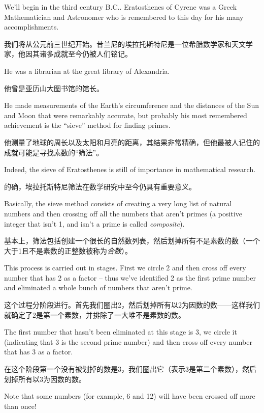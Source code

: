 We'll begin in the 
third century B.C..   
Eratosthenes of Cyrene was a Greek Mathematician and
Astronomer who is remembered to this day for his many accomplishments.

我们将从公元前三世纪开始。昔兰尼的埃拉托斯特尼是一位希腊数学家和天文学家，他因其诸多成就至今仍被人们铭记。

He was a librarian at the great library of Alexandria.

他曾是亚历山大图书馆的馆长。

He made
measurements of the Earth's circumference and the distances of
the Sun and Moon that were remarkably accurate, but probably his
most remembered achievement is the ``sieve'' method for finding
primes.

他测量了地球的周长以及太阳和月亮的距离，其结果非常精确，但他最被人记住的成就可能是寻找素数的“筛法”。

Indeed, the sieve of Eratosthenes 
is still of importance
in mathematical research.

的确，埃拉托斯特尼筛法在数学研究中至今仍具有重要意义。

Basically, the sieve method consists 
of creating a very long list of natural numbers and then crossing
off all the numbers that aren't primes (a positive integer that
isn't 1, and isn't a prime is called \emph{ composite}).

基本上，筛法包括创建一个很长的自然数列表，然后划掉所有不是素数的数（一个大于1且不是素数的正整数被称为\emph{合数}）。

This process
is carried out in stages.  First we circle 2 and then cross off
every number that has 2 as a factor -- thus we've identified 
2 as the first prime number and eliminated a whole bunch of numbers 
that aren't prime.

这个过程分阶段进行。首先我们圈出2，然后划掉所有以2为因数的数——这样我们就确定了2是第一个素数，并排除了一大堆不是素数的数。

The first number that hasn't been eliminated at
this stage is 3, we circle it (indicating that 3 is the second prime
number) and then cross off every number that has 3 as a factor.

在这个阶段第一个没有被划掉的数是3，我们圈出它（表示3是第二个素数），然后划掉所有以3为因数的数。

Note
that some numbers (for example, 6 and 12) will have been crossed off
more than once!

